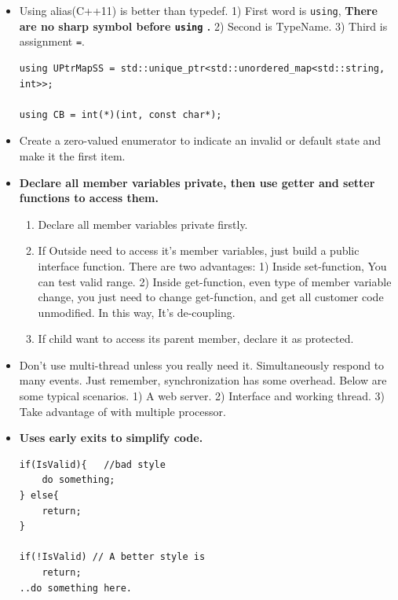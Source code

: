\documentclass[a4paper,11pt,twoside]{book}
\begin{document}
\begin{itemize}
	\item Using alias(C++11) is better than typedef. 
	1) First word is \texttt{using}, \textbf{There are no sharp symbol before \texttt{using} .} 
	2) Second is TypeName. 
	3) Third is assignment \texttt{=}.  
	
\begin{lstlisting}[numbers=none]
using UPtrMapSS = std::unique_ptr<std::unordered_map<std::string, int>>;

using CB = int(*)(int, const char*);
\end{lstlisting}
	
	\item Create a zero-valued enumerator to indicate an invalid or default state and make it the first item.
	
	\item \textbf{Declare all member variables private, then use getter and setter functions to access them.}
	\begin{enumerate}
		\item Declare all member variables private firstly.
		
		\item If Outside need to access it's member variables, just build a public interface function. There are two advantages: 1) Inside set-function, You can test valid range. 2) Inside get-function, even type of member variable change, you just need to change get-function, and get all customer code unmodified. In this way, It's de-coupling.
		
		\item If child want to access its parent member, declare it as protected.
		
	\end{enumerate}
	
	\item Don't use multi-thread unless you really need it. Simultaneously respond to many events. Just remember, synchronization has some overhead. Below are some typical scenarios.
	1) A web server.
	2) Interface and working thread.
	3) Take advantage of with multiple processor.

	
	\item \textbf{Uses early exits to simplify code.}
	
\begin{lstlisting}[numbers=none]
if(IsValid){   //bad style
	do something;
} else{
	return;
}
	
if(!IsValid) // A better style is
	return;
..do something here.
\end{lstlisting}
	

\end{itemize}
\end{document}
